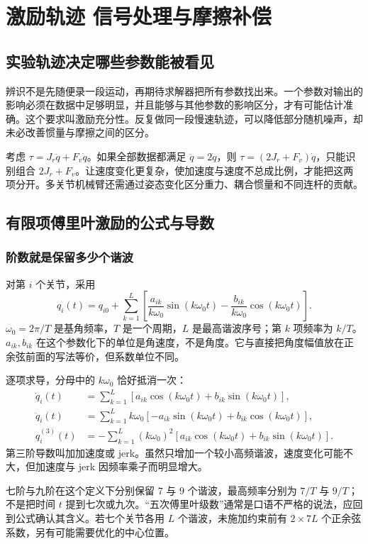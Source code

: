 \chapter{激励轨迹 信号处理与摩擦补偿}\label{ch:excitation_friction}
\section{实验轨迹决定哪些参数能被看见}
辨识不是先随便录一段运动，再期待求解器把所有参数找出来。一个参数对输出的影响必须在数据中足够明显，并且能够与其他参数的影响区分，才有可能估计准确。这个要求叫激励充分性。反复做同一段慢速轨迹，可以降低部分随机噪声，却未必改善惯量与摩擦之间的区分。

考虑 $\tau=J_r\ddot q+F_v\dot q$。如果全部数据都满足 $\ddot q=2\dot q$，则 $\tau=(2J_r+F_v)\dot q$，只能识别组合 $2J_r+F_v$。让速度变化更复杂，使加速度与速度不总成比例，才能把这两项分开。多关节机械臂还需通过姿态变化区分重力、耦合惯量和不同连杆的贡献。

\section{有限项傅里叶激励的公式与导数}
\subsection{阶数就是保留多少个谐波}
对第 $i$ 个关节，采用
\begin{equation}\label{eq:fourier_di}
 q_i(t)=q_{i0}+\sum_{k=1}^{L}\left[
 \frac{a_{ik}}{k\omega_0}\sin(k\omega_0t)-\frac{b_{ik}}{k\omega_0}\cos(k\omega_0t)\right].
\end{equation}
$\omega_0=2\pi/T$ 是基角频率，$T$ 是一个周期，$L$ 是最高谐波序号；第 $k$ 项频率为 $k/T$。$a_{ik},b_{ik}$ 在这个参数化下的单位是角速度，不是角度。它与直接把角度幅值放在正余弦前面的写法等价，但系数单位不同。

逐项求导，分母中的 $k\omega_0$ 恰好抵消一次：
\begin{align}
 \dot q_i(t)&=\sum_{k=1}^{L}[a_{ik}\cos(k\omega_0t)+b_{ik}\sin(k\omega_0t)],\\
 \ddot q_i(t)&=\sum_{k=1}^{L}k\omega_0[-a_{ik}\sin(k\omega_0t)+b_{ik}\cos(k\omega_0t)],\\
 q_i^{(3)}(t)&=-\sum_{k=1}^{L}(k\omega_0)^2[a_{ik}\cos(k\omega_0t)+b_{ik}\sin(k\omega_0t)].
\end{align}
第三阶导数叫加加速度或 jerk。虽然只增加一个较小高频谐波，速度变化可能不大，但加速度与 jerk 因频率乘子而明显增大。

七阶与九阶在这个定义下分别保留 $7$ 与 $9$ 个谐波，最高频率分别为 $7/T$ 与 $9/T$；不是把时间 $t$ 提到七次或九次。“五次傅里叶级数”通常是口语不严格的说法，应回到公式确认其含义。若七个关节各用 $L$ 个谐波，未施加约束前有 $2\times7L$ 个正余弦系数，另有可能需要优化的中心位置。

